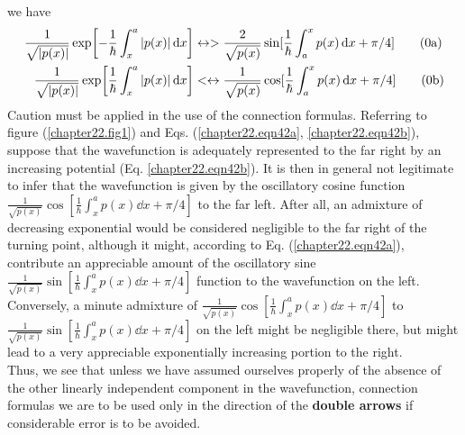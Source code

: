 we have
\begin{align}
\frac{1}{\sqrt{\abs{p(x)}}} \exp[-\frac{1}{\hbar}\int_{x}^{a} \abs{p(x)} \dd{x}] &\leftrightarrow > \frac{2}{\sqrt{p(x)}} \sin[\frac{1}{\hbar}\int_{a}^{x} p(x) \dd{x} + \pi/4] \label{chapter22.eqn43a}
\tag{\theequation a} \\
\frac{1}{\sqrt{\abs{p(x)}}} \exp[\frac{1}{\hbar}\int_{x}^{a} \abs{p(x)} \dd{x}] &<\leftrightarrow  \frac{1}{\sqrt{p(x)}} \cos[\frac{1}{\hbar}\int_{a}^{x} p(x) \dd{x} + \pi/4] \label{chapter22.eqn43b}
\tag{\theequation b} \\
\end{align}
Caution must be applied in the use of the connection formulas. Referring to figure (\ref{chapter22.fig1}) and Eqs. (\ref{chapter22.eqn42a}, \ref{chapter22.eqn42b}), suppose that the wavefunction is adequately represented to the far right by an increasing potential (Eq. \ref{chapter22.eqn42b}). It is then in general not legitimate to infer that the wavefunction is given by the oscillatory cosine function $\frac{1}{\sqrt{p(x)}} \cos[\frac{1}{\hbar}\int_{x}^{a} p(x) \dd{x} + \pi/4]$ to the far left. After all, 
an admixture of decreasing exponential would be considered negligible to the far right of the turning point, although it might, according to Eq. (\ref{chapter22.eqn42a}), contribute an appreciable amount of the oscillatory sine 
$\frac{1}{\sqrt{p(x)}} \sin[\frac{1}{\hbar}\int_{x}^{a} p(x) \dd{x} + \pi/4]$
function to the wavefunction on the left.\\

Conversely, a minute admixture of 
$\frac{1}{\sqrt{p(x)}} \cos[\frac{1}{\hbar}\int_{x}^{a} p(x) \dd{x} + \pi/4]$
to
$\frac{1}{\sqrt{p(x)}} \sin[\frac{1}{\hbar}\int_{x}^{a} p(x) \dd{x} + \pi/4]$
on the left might be negligible there, but might lead to a very appreciable exponentially increasing portion to the right.\\

Thus, we see that unless we have assumed ourselves properly of the absence  of the other linearly independent component in the wavefunction, connection formulas we are to be used only in the direction of the \textbf{double arrows} if considerable error is to be avoided.



